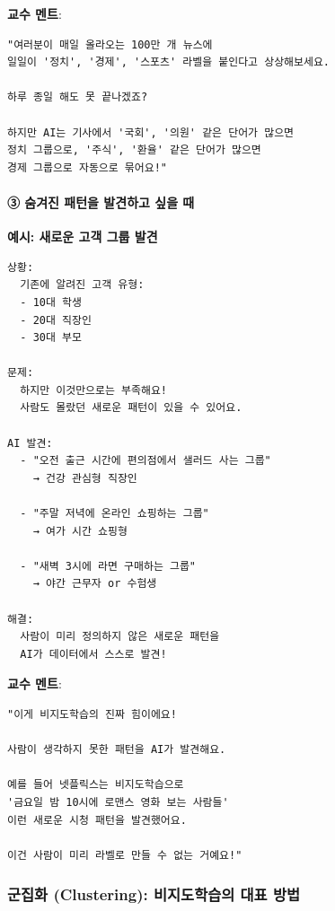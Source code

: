 \documentclass[a4paper, 11pt]{article}
\begin{document}
\textbf{교수 멘트}:

\begin{verbatim}
"여러분이 매일 올라오는 100만 개 뉴스에
일일이 '정치', '경제', '스포츠' 라벨을 붙인다고 상상해보세요.

하루 종일 해도 못 끝나겠죠?

하지만 AI는 기사에서 '국회', '의원' 같은 단어가 많으면
정치 그룹으로, '주식', '환율' 같은 단어가 많으면
경제 그룹으로 자동으로 묶어요!"
\end{verbatim}

\hypertarget{uxc228uxaca8uxc9c4-uxd328uxd134uxc744-uxbc1cuxacacuxd558uxace0-uxc2f6uxc744-uxb54c}{%
\paragraph{\textbf{③} 숨겨진 패턴을 발견하고 싶을
때}\label{uxc228uxaca8uxc9c4-uxd328uxd134uxc744-uxbc1cuxacacuxd558uxace0-uxc2f6uxc744-uxb54c}}

\textbf{예시: 새로운 고객 그룹 발견}

\begin{verbatim}
상황:
  기존에 알려진 고객 유형:
  - 10대 학생
  - 20대 직장인
  - 30대 부모

문제:
  하지만 이것만으로는 부족해요!
  사람도 몰랐던 새로운 패턴이 있을 수 있어요.

AI 발견:
  - "오전 출근 시간에 편의점에서 샐러드 사는 그룹"
    → 건강 관심형 직장인
  
  - "주말 저녁에 온라인 쇼핑하는 그룹"
    → 여가 시간 쇼핑형
  
  - "새벽 3시에 라면 구매하는 그룹"
    → 야간 근무자 or 수험생

해결:
  사람이 미리 정의하지 않은 새로운 패턴을
  AI가 데이터에서 스스로 발견!
\end{verbatim}

\textbf{교수 멘트}:

\begin{verbatim}
"이게 비지도학습의 진짜 힘이에요!

사람이 생각하지 못한 패턴을 AI가 발견해요.

예를 들어 넷플릭스는 비지도학습으로
'금요일 밤 10시에 로맨스 영화 보는 사람들'
이런 새로운 시청 패턴을 발견했어요.

이건 사람이 미리 라벨로 만들 수 없는 거예요!"
\end{verbatim}

\hypertarget{uxad70uxc9d1uxd654-clustering-uxbe44uxc9c0uxb3c4uxd559uxc2b5uxc758-uxb300uxd45c-uxbc29uxbc95}{%
\subsubsection{군집화 (Clustering): 비지도학습의 대표
방법}\label{uxad70uxc9d1uxd654-clustering-uxbe44uxc9c0uxb3c4uxd559uxc2b5uxc758-uxb300uxd45c-uxbc29uxbc95}}
\end{document}
